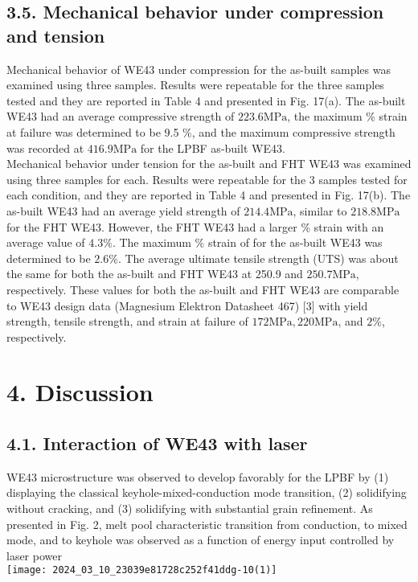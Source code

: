 \documentclass[10pt]{article}
\begin{document}
\subsection*{3.5. Mechanical behavior under compression and tension}
Mechanical behavior of WE43 under compression for the as-built samples was examined using three samples. Results were repeatable for the three samples tested and they are reported in Table 4 and presented in Fig. 17(a). The as-built WE43 had an average compressive strength of $223.6 \mathrm{MPa}$, the maximum \% strain at failure was determined to be 9.5 $\%$, and the maximum compressive strength was recorded at $416.9 \mathrm{MPa}$ for the LPBF as-built WE43.\\
Mechanical behavior under tension for the as-built and FHT WE43 was examined using three samples for each. Results were repeatable for the 3 samples tested for each condition, and they are reported in Table 4 and presented in Fig. 17(b). The as-built WE43 had an average yield strength of $214.4 \mathrm{MPa}$, similar to $218.8 \mathrm{MPa}$ for the FHT WE43. However, the FHT WE43 had a larger \% strain with an average value of $4.3 \%$. The maximum $\%$ strain of for the as-built WE43 was determined to be $2.6 \%$. The average ultimate tensile strength (UTS) was about the same for both the as-built and FHT WE43 at 250.9 and $250.7 \mathrm{MPa}$, respectively. These values for both the as-built and FHT WE43 are comparable to WE43 design data (Magnesium Elektron Datasheet 467) [3] with yield strength, tensile strength, and strain at failure of $172 \mathrm{MPa}, 220 \mathrm{MPa}$, and $2 \%$, respectively.

\section*{4. Discussion}
\subsection*{4.1. Interaction of WE43 with laser}
WE43 microstructure was observed to develop favorably for the LPBF by (1) displaying the classical keyhole-mixed-conduction mode transition, (2) solidifying without cracking, and (3) solidifying with substantial grain refinement. As presented in Fig. 2, melt pool characteristic transition from conduction, to mixed mode, and to keyhole was observed as a function of energy input controlled by laser power\\
\texttt{[image: 2024\_03\_10\_23039e81728c252f41ddg-10(1)]}
\end{document}
